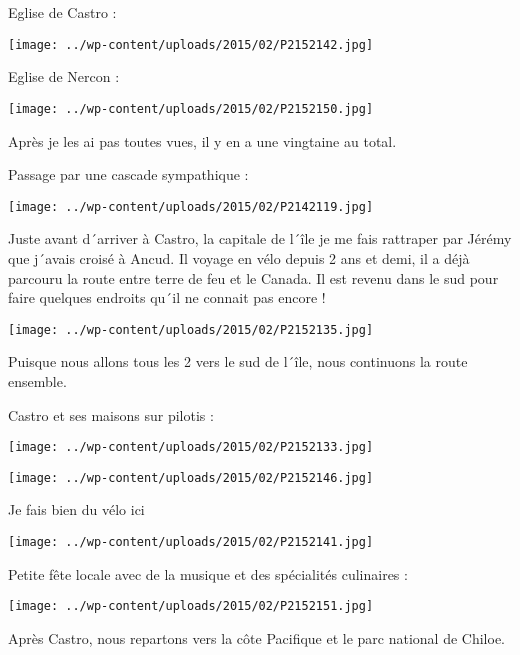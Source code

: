  Eglise de Castro :
\begin{center} \texttt{[image: ../wp-content/uploads/2015/02/P2152142.jpg]} \end{center}

 Eglise de Nercon :
\begin{center} \texttt{[image: ../wp-content/uploads/2015/02/P2152150.jpg]} \end{center}

 Après je les ai pas toutes vues, il y en a une vingtaine au total.

 Passage par une cascade sympathique :
\begin{center} \texttt{[image: ../wp-content/uploads/2015/02/P2142119.jpg]} \end{center}

 Juste avant d´arriver à Castro, la capitale de l´île je me fais rattraper par Jérémy que j´avais croisé à Ancud. Il voyage en vélo depuis 2 ans et demi, il a déjà parcouru la route entre terre de feu et le Canada. Il est revenu dans le sud pour faire quelques endroits qu´il ne connait pas encore !
\begin{center} \texttt{[image: ../wp-content/uploads/2015/02/P2152135.jpg]} \end{center}

 Puisque nous allons tous les 2 vers le sud de l´île, nous continuons la route ensemble.

 Castro et ses maisons sur pilotis :
\begin{center} \texttt{[image: ../wp-content/uploads/2015/02/P2152133.jpg]} \end{center}
\begin{center} \texttt{[image: ../wp-content/uploads/2015/02/P2152146.jpg]} \end{center}

 Je fais bien du vélo ici
\begin{center} \texttt{[image: ../wp-content/uploads/2015/02/P2152141.jpg]} \end{center}

\pagebreak
 Petite fête locale avec de la musique et des spécialités culinaires :
\begin{center} \texttt{[image: ../wp-content/uploads/2015/02/P2152151.jpg]} \end{center}

 Après Castro, nous repartons vers la côte Pacifique et le parc national de Chiloe.

